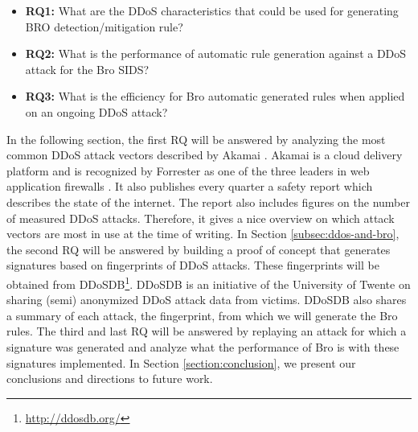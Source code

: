 \begin{itemize}	
	\item \textbf{RQ1:} What are the DDoS characteristics that could be used for generating BRO detection/mitigation rule?
	\item \textbf{RQ2:} What is the performance of automatic rule generation against a DDoS attack for the Bro SIDS?
	 \item \textbf{RQ3:} What is the efficiency for Bro automatic generated rules when applied on an ongoing DDoS attack?
\end{itemize}

In the following section, the first RQ will be answered by analyzing the most common DDoS attack vectors described by Akamai \cite{Akamai2017-4}. Akamai is a cloud delivery platform and is recognized by Forrester as one of the three leaders in web application firewalls \cite{forrester2018}. It also publishes every quarter a safety report which describes the state of the internet. The report also includes figures on the number of measured DDoS attacks. Therefore, it gives a nice overview on which attack vectors are most in use at the time of writing. In Section \ref{subsec:ddos-and-bro}, the second RQ will be answered by building a proof of concept that generates signatures based on fingerprints of DDoS attacks. These fingerprints will be obtained from DDoSDB\footnote{\url{http://ddosdb.org/}}. DDoSDB is an initiative of the University of Twente on sharing (semi) anonymized DDoS attack data from victims. DDoSDB also shares a summary of each attack, the fingerprint, from which we will generate the Bro rules. The third and last RQ will be answered by replaying an attack for which a signature was generated and analyze what the performance of Bro is with these signatures implemented. In Section \ref{section:conclusion}, we present our conclusions and directions to future work. 






